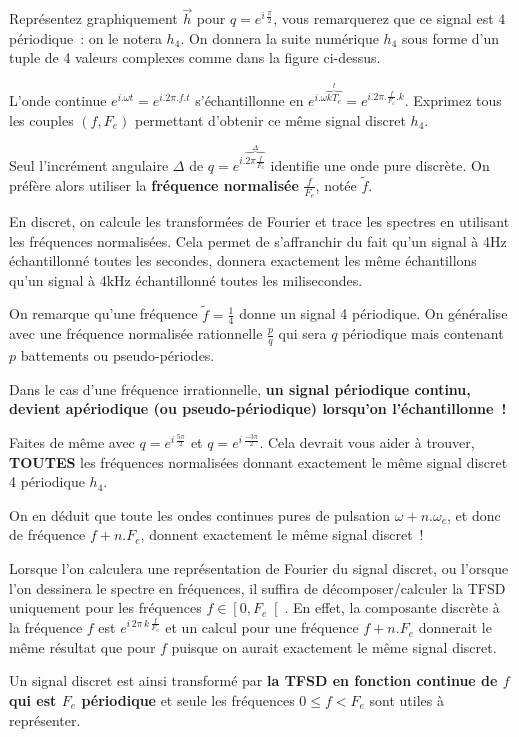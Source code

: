 Représentez graphiquement $\vec{h}$ pour $q=e^{i\,\frac{\pi}{2}}$,
vous remarquerez que ce signal est $4$ périodique~: on le notera
$h_4$. On donnera la suite numérique $h_4$ sous forme d'un tuple de 4 valeurs
complexes comme dans la figure ci-dessus.

L'onde continue $e^{i.\omega t}=e^{i.2\pi.f.t}$ s'échantillonne en
$e^{i.\omega \overbrace{k
    T_e}^{t}}=e^{i.2\pi.\frac{f}{F_e}.k}$. Exprimez tous les couples
$(f, F_e)$ permettant d'obtenir ce même signal discret $h_4$.

\begin{remarque}
  Seul l'incrément angulaire $\Delta$ de
  $q=e^{i.\overbrace{2\pi\frac{f}{F_e}}^{\Delta}}$
  identifie une onde pure discrète. On
  préfère alors  utiliser la \textbf{fréquence normalisée}
  $\frac{f}{F_e}$, notée $\widetilde{f}$.

  En discret, on calcule les transformées de Fourier et trace les spectres en utilisant
  les fréquences normalisées.  Cela permet de s'affranchir du fait
  qu'un signal à 4Hz échantillonné toutes les secondes, donnera
  exactement les même échantillons qu'un signal à 4kHz échantillonné
  toutes les milisecondes.

  On remarque qu'une fréquence $\widetilde{f}=\frac{1}{4}$ donne un
  signal 4 périodique. On généralise avec une fréquence normalisée
  rationnelle $\frac{p}{q}$ qui sera $q$ périodique mais contenant $p$
  battements ou pseudo-périodes.

  Dans le cas d'une fréquence irrationnelle, \textbf{un signal
    périodique continu, devient apériodique (ou pseudo-périodique)
    lorsqu'on l'échantillonne~!}
  
\end{remarque}



Faites de même avec $q=e^{i\,\frac{5\pi}{2}}$ et
$q=e^{i\,\frac{-3\pi}{2}}$. Cela devrait vous aider à trouver,
\textbf{TOUTES} les fréquences normalisées donnant exactement le même
signal discret 4 périodique $h_4$.

\begin{remarque}
  On en déduit que toute les ondes continues pures de
  pulsation $\omega + n.\omega_e$, et donc de fréquence
  $f + n.F_e$, donnent exactement le même signal discret~!

  
  Lorsque l'on calculera une représentation de Fourier du signal
  discret, ou l'orsque l'on dessinera le spectre en fréquences, il
  suffira de décomposer/calculer la TFSD uniquement pour les
  fréquences $f \in \left[0 , F_e\right[$. En effet, la composante
  discrète à la fréquence $f$ est $e^{i\,2\pi\,k\,\frac{f}{F_e}}$ et
  un calcul pour une fréquence $f + n.F_e$ donnerait le même résultat
  que pour $f$ puisque on aurait exactement le même signal discret.

  Un signal discret est ainsi transformé par \textbf{la TFSD en
    fonction continue de $f$ qui est $F_e$ périodique} et seule les
  fréquences $0\le f<F_e$ sont utiles à représenter.

\end{remarque}

